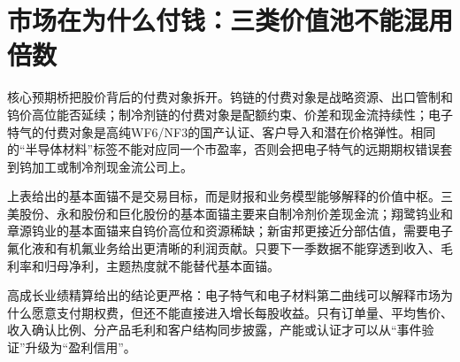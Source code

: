 \section{市场在为什么付钱：三类价值池不能混用倍数}
核心预期桥把股价背后的付费对象拆开。钨链的付费对象是战略资源、出口管制和钨价高位能否延续；制冷剂链的付费对象是配额约束、价差和现金流持续性；电子特气的付费对象是高纯WF6/NF3的国产认证、客户导入和潜在价格弹性。相同的“半导体材料”标签不能对应同一个市盈率，否则会把电子特气的远期期权错误套到钨加工或制冷剂现金流公司上。

\begin{exhibitbox}[核心标的市场预期桥]
\scriptsize
{}
\end{exhibitbox}

上表给出的基本面锚不是交易目标，而是财报和业务模型能够解释的价值中枢。三美股份、永和股份和巨化股份的基本面锚主要来自制冷剂价差现金流；翔鹭钨业和章源钨业的基本面锚来自钨价高位和资源稀缺；新宙邦更接近分部估值，需要电子氟化液和有机氟业务给出更清晰的利润贡献。只要下一季数据不能穿透到收入、毛利率和归母净利，主题热度就不能替代基本面锚。

高成长业绩精算给出的结论更严格：电子特气和电子材料第二曲线可以解释市场为什么愿意支付期权费，但还不能直接进入增长每股收益。只有订单量、平均售价、收入确认比例、分产品毛利和客户结构同步披露，产能或认证才可以从“事件验证”升级为“盈利信用”。

